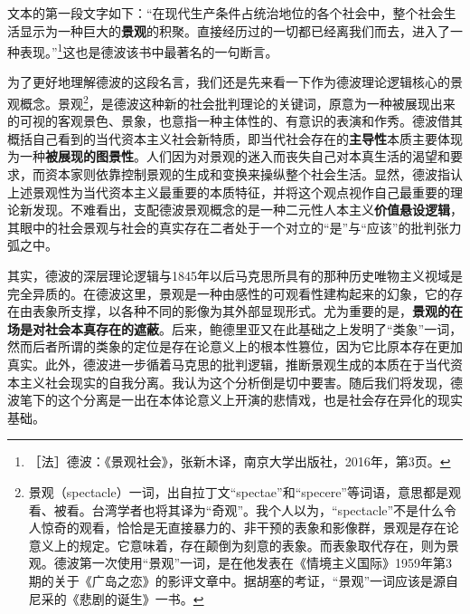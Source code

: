 \documentclass[fontset=fandol, a4paper, 12pt, openright]{ctexbook}
\begin{document}
文本的第一段文字如下：“在现代生产条件占统治地位的各个社会中，整个社会生活显示为一种巨大的\textbf{景观}的积聚。直接经历过的一切都已经离我们而去，进入了一种表现。”\footnote{［法］德波：《景观社会》，张新木译，南京大学出版社，2016年，第3页。}这也是德波该书中最著名的一句断言。

为了更好地理解德波的这段名言，我们还是先来看一下作为德波理论逻辑核心的景观概念。景观\footnote{景观（spectacle）一词，出自拉丁文“spectae”和“specere”等词语，意思都是观看、被看。台湾学者也将其译为“奇观”。我个人以为，“spectacle”不是什么令人惊奇的观看，恰恰是无直接暴力的、非干预的表象和影像群，景观是存在论意义上的规定。它意味着，存在颠倒为刻意的表象。而表象取代存在，则为景观。德波第一次使用“景观”一词，是在他发表在《情境主义国际》1959年第3期的关于《广岛之恋》的影评文章中。据胡塞的考证，“景观”一词应该是源自尼采的《悲剧的诞生》一书。}，是德波这种新的社会批判理论的关键词，原意为一种被展现出来的可视的客观景色、景象，也意指一种主体性的、有意识的表演和作秀。德波借其概括自己看到的当代资本主义社会新特质，即当代社会存在的\textbf{主导性}本质主要体现为一种\textbf{被展现的图景性}。人们因为对景观的迷入而丧失自己对本真生活的渴望和要求，而资本家则依靠控制景观的生成和变换来操纵整个社会生活。显然，德波指认上述景观性为当代资本主义最重要的本质特征，并将这个观点视作自己最重要的理论新发现。不难看出，支配德波景观概念的是一种二元性人本主义\textbf{价值悬设逻辑}，其眼中的社会景观与社会的真实存在二者处于一个对立的“是”与“应该”的批判张力弧之中。

其实，德波的深层理论逻辑与1845年以后马克思所具有的那种历史唯物主义视域是完全异质的。在德波这里，景观是一种由感性的可观看性建构起来的幻象，它的存在由表象所支撑，以各种不同的影像为其外部显现形式。尤为重要的是，\textbf{景观的在场是对社会本真存在的遮蔽}。后来，鲍德里亚又在此基础之上发明了“类象”一词，然而后者所谓的类象的定位是存在论意义上的根本性篡位，因为它比原本存在更加真实。此外，德波进一步循着马克思的批判逻辑，推断景观生成的本质在于当代资本主义社会现实的自我分离。我认为这个分析倒是切中要害。随后我们将发现，德波笔下的这个分离是一出在本体论意义上开演的悲情戏，也是社会存在异化的现实基础。
\end{document}
